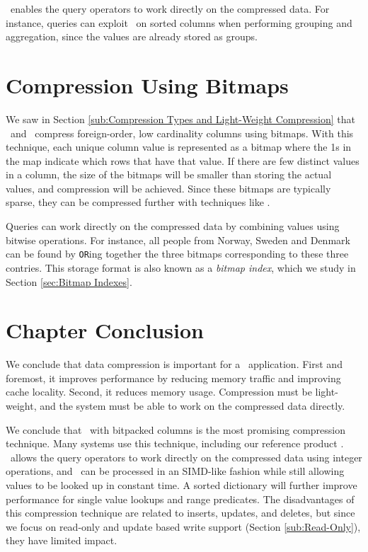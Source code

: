 \rle~enables the query operators to work directly on the compressed data. For instance, queries can exploit \rle~on sorted columns when performing grouping and aggregation, since the values are already stored as groups. 

\section{Compression Using Bitmaps}
\label{sec:Compression Using Bitmaps}
We saw in Section \ref{sub:Compression Types and Light-Weight Compression} that \cstore~and \vertica~compress foreign-order, low cardinality columns using bitmaps. With this technique, each unique column value is represented as a bitmap where the 1s in the map indicate which rows that have that value. If there are few distinct values in a column, the size of the bitmaps will be smaller than storing the actual values, and compression will be achieved. Since these bitmaps are typically sparse, they can be compressed further with techniques like \rle.

Queries can work directly on the compressed data by combining values using bitwise operations. For instance, all people from Norway, Sweden and Denmark can be found by \texttt{OR}ing together the three bitmaps corresponding to these three contries. This storage format is also known as a \textit{bitmap index}, which we study in Section \ref{sec:Bitmap Indexes}.

\section{Chapter Conclusion}
\label{sec:Chapter Conclusion}
We conclude that data compression is important for a \bd~application. First and foremost, it improves performance by reducing memory traffic and improving cache locality. Second, it reduces memory usage. Compression must be light-weight, and the system must be able to work on the compressed data directly.

We conclude that \de~with bitpacked columns is the most promising compression technique. Many systems use this technique, including our reference product \qlikview. \de~allows the query operators to work directly on the compressed data using integer operations, and \bp~can be processed in an SIMD-like fashion while still allowing values to be looked up in constant time. A sorted dictionary will further improve performance for single value lookups and range predicates. The disadvantages of this compression technique are related to inserts, updates, and deletes, but since we focus on read-only and update based write support (Section \ref{sub:Read-Only}), they have limited impact.


